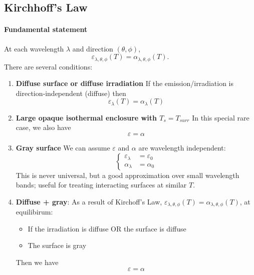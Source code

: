 \subsection*{Kirchhoff’s Law}

\paragraph{Fundamental statement}
At each wavelength $\lambda$ and direction $(\theta,\phi)$,
\[
  \varepsilon_{\lambda,\theta,\phi}(T)=\alpha_{\lambda,\theta,\phi}(T).
\]
%
There are several conditions:
\begin{enumerate}[(1)]
    \item \textbf{Diffuse surface or diffuse irradiation}
    If the emission/irradiation is direction‑independent (diffuse) then
    \[
      \varepsilon_{\lambda}(T)=\alpha_{\lambda}(T)
    \]
    \item \textbf{Large opaque isothermal enclosure with $T_s=T_{surr}$}
    In this special rare case, we also have
    \[
            \varepsilon =\alpha
    \]
    
    \item \textbf{Gray surface}
        We can assume $\varepsilon$ and $\alpha$ are wavelength independent:
        \[
            \left\{\begin{aligned}
                \varepsilon_{\lambda} &=\varepsilon_0
                \\[0.5em]
                \alpha_{\lambda} &=\alpha_0        
            \end{aligned}\right.
        \] 
        This is never universal, but a good approximation over small wavelength bands; useful for treating interacting surfaces at similar $T$.
        \begin{figure}[H]
            \centering
            
        \end{figure}
        \item \textbf{Diffuse + gray}: As a result of Kirchoff’s Law, $  \varepsilon_{\lambda,\theta,\phi}(T)=\alpha_{\lambda,\theta,\phi}(T)$, at equilibirum:
        \begin{itemize}
            \item If the irradiation is diffuse OR the surface is diffuse
            \item The surface is gray
        \end{itemize}
        Then we have
        \[
                \varepsilon = \alpha
        \]
\end{enumerate}
%


